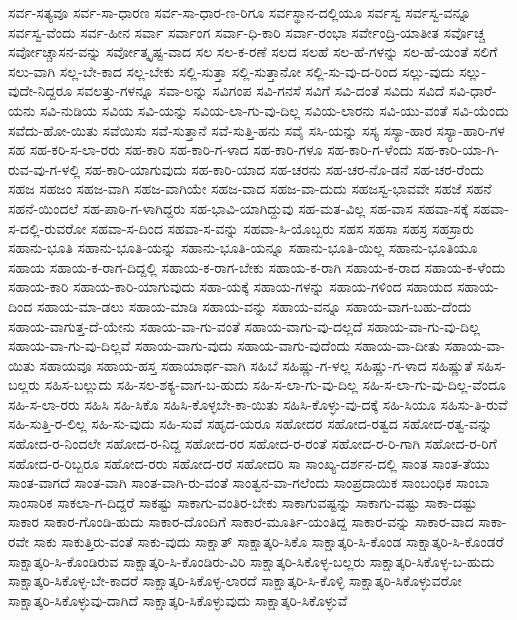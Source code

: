 ಸರ್ವ-ಸತ್ಯವೂ
ಸರ್ವ-ಸಾ-ಧಾರಣ
ಸರ್ವ-ಸಾ-ಧಾರ-ಣ-ರಿಗೂ
ಸರ್ವಸ್ಥಾನ-ದಲ್ಲಿಯೂ
ಸರ್ವಸ್ವ
ಸರ್ವಸ್ವ-ವನ್ನೂ
ಸರ್ವಸ್ವ-ವೆಂದು
ಸರ್ವ-ಹೀನ
ಸರ್ವಾ
ಸರ್ವಾಂಗ
ಸರ್ವಾ-ಧಿ-ಕಾರಿ
ಸರ್ವಾ-ರಂಭಾ
ಸರ್ವೇಂದ್ರಿ-ಯಾತೀತ
ಸರ್ವೊಚ್ಚ
ಸರ್ವೋಚ್ಚಾಸನ-ವನ್ನು
ಸರ್ವೋತ್ಕೃಷ್ಟ-ವಾದ
ಸಲ
ಸಲ-ಕ-ರಣೆ
ಸಲದ
ಸಲಹೆ
ಸಲ-ಹೆ-ಗಳನ್ನು
ಸಲ-ಹೆ-ಯಂತೆ
ಸಲಿಗೆ
ಸಲು-ವಾಗಿ
ಸಲ್ಲ-ಬೇ-ಕಾದ
ಸಲ್ಲ-ಬೇಕು
ಸಲ್ಲಿ-ಸುತ್ತಾ
ಸಲ್ಲಿ-ಸುತ್ತಾನೋ
ಸಲ್ಲಿ-ಸು-ವು-ದ-ರಿಂದ
ಸಲ್ಲು-ವುದು
ಸಲ್ಲು-ವುದೇ-ನಿದ್ದರೂ
ಸವಲತ್ತು-ಗಳನ್ನೂ
ಸವಾ-ಲನ್ನು
ಸವಿಗಂಪ
ಸವಿ-ಗನಸೆ
ಸವಿಗೆ
ಸವಿ-ದಂತೆ
ಸವಿದು
ಸವಿದೆ
ಸವಿ-ಧಾರೆ-ಯನು
ಸವಿ-ನುಡಿಯ
ಸವಿಯ
ಸವಿ-ಯನ್ನು
ಸವಿಯ-ಲಾ-ಗು-ವು-ದಿಲ್ಲ
ಸವಿಯ-ಲಾರನು
ಸವಿ-ಯು-ವಂತೆ
ಸವಿ-ಯೆಂದು
ಸವೆದು-ಹೋ-ಯಿತು
ಸವೆಯಿಸು
ಸವೆ-ಸುತ್ತಾನೆ
ಸವೆ-ಸುತ್ತಿ-ಹನು
ಸವೈ
ಸಸಿ-ಯನ್ನು
ಸಸ್ಯ
ಸಸ್ಯಾ-ಹಾರ
ಸಸ್ಯಾ-ಹಾರಿ-ಗಳ
ಸಹ
ಸಹ-ಕರಿ-ಸ-ಲಾ-ರರು
ಸಹ-ಕಾರಿ
ಸಹ-ಕಾರಿ-ಗ-ಳಾದ
ಸಹ-ಕಾರಿ-ಗಳೂ
ಸಹ-ಕಾರಿ-ಗ-ಳೆಂದು
ಸಹ-ಕಾರಿ-ಯಾ-ಗಿ-ರುವ-ವು-ಗ-ಳಲ್ಲಿ
ಸಹ-ಕಾರಿ-ಯಾಗುವುದು
ಸಹ-ಕಾರಿ-ಯಾದ
ಸಹ-ಚರನು
ಸಹ-ಚರ-ನೊ-ಡನೆ
ಸಹ-ಚರ-ರೆಂದು
ಸಹಜ
ಸಹಜಂ
ಸಹಜ-ವಾಗಿ
ಸಹಜ-ವಾಗಿಯೇ
ಸಹಜ-ವಾದ
ಸಹಜ-ವಾ-ದುದು
ಸಹಜಸ್ವ-ಭಾವವೇ
ಸಹಜೆ
ಸಹನೆ
ಸಹನೆ-ಯಿಂದಲೆ
ಸಹ-ಪಾಠಿ-ಗ-ಳಾಗಿದ್ದರು
ಸಹ-ಭಾವಿ-ಯಾಗಿದ್ದುವು
ಸಹ-ಮತ-ವಿಲ್ಲ
ಸಹ-ವಾಸ
ಸಹವಾ-ಸಕ್ಕೆ
ಸಹವಾ-ಸ-ದಲ್ಲಿ-ರುವರೋ
ಸಹವಾ-ಸ-ದಿಂದ
ಸಹವಾ-ಸ-ವನ್ನು
ಸಹವಾ-ಸಿ-ಯೊಬ್ಬರು
ಸಹಸ
ಸಹಸಾ
ಸಹಸ್ರ
ಸಹಸ್ರಾರು
ಸಹಾನು-ಭೂತಿ
ಸಹಾನು-ಭೂತಿ-ಯನ್ನು
ಸಹಾನು-ಭೂತಿ-ಯನ್ನೂ
ಸಹಾನು-ಭೂತಿ-ಯಿಲ್ಲ
ಸಹಾನು-ಭೂತಿಯೂ
ಸಹಾಯ
ಸಹಾಯ-ಕ-ರಾಗ-ದಿದ್ದಲ್ಲಿ
ಸಹಾಯ-ಕ-ರಾಗ-ಬೇಕು
ಸಹಾಯ-ಕ-ರಾಗಿ
ಸಹಾಯ-ಕ-ರಾದ
ಸಹಾಯ-ಕ-ಳೆಂದು
ಸಹಾಯ-ಕಾರಿ
ಸಹಾಯ-ಕಾರಿ-ಯಾಗುವುದು
ಸಹಾ-ಯಕ್ಕೆ
ಸಹಾಯ-ಗಳನ್ನು
ಸಹಾಯ-ಗಳಿಂದ
ಸಹಾಯದ
ಸಹಾಯ-ದಿಂದ
ಸಹಾಯ-ಮಾ-ಡಲು
ಸಹಾಯ-ಮಾಡಿ
ಸಹಾಯ-ವನ್ನು
ಸಹಾಯ-ವನ್ನೂ
ಸಹಾಯ-ವಾಗ-ಬಹು-ದೆಂದು
ಸಹಾಯ-ವಾಗುತ್ತ-ದೆ-ಯೇನು
ಸಹಾಯ-ವಾ-ಗು-ವಂತೆ
ಸಹಾಯ-ವಾಗು-ವು-ದಲ್ಲದೆ
ಸಹಾಯ-ವಾ-ಗು-ವು-ದಿಲ್ಲ
ಸಹಾಯ-ವಾ-ಗು-ವು-ದಿಲ್ಲವೆ
ಸಹಾಯ-ವಾಗು-ವುದು
ಸಹಾಯ-ವಾಗು-ವುದೆಂದು
ಸಹಾಯ-ವಾ-ದೀತು
ಸಹಾಯ-ವಾ-ಯಿತು
ಸಹಾಯವೂ
ಸಹಾಯ-ಹಸ್ತ
ಸಹಾಯಾರ್ಥ-ವಾಗಿ
ಸಹಿಬೆ
ಸಹಿಷ್ಣು-ಗ-ಳಲ್ಲ
ಸಹಿಷ್ಣು-ಗ-ಳಾದ
ಸಹಿಷ್ಣುತೆ
ಸಹಿಸ-ಬಲ್ಲರು
ಸಹಿಸ-ಬಲ್ಲುದು
ಸಹಿ-ಸಲ-ಶಕ್ಯ-ವಾಗ-ಬ-ಹುದು
ಸಹಿ-ಸ-ಲಾ-ಗು-ವು-ದಿಲ್ಲ
ಸಹಿ-ಸ-ಲಾ-ಗು-ವು-ದಿಲ್ಲ-ವೆಂದೂ
ಸಹಿ-ಸ-ಲಾ-ರರು
ಸಹಿಸಿ
ಸಹಿ-ಸಿಕೊ
ಸಹಿಸಿ-ಕೊಳ್ಳಬೇ-ಕಾ-ಯಿತು
ಸಹಿಸಿ-ಕೊಳ್ಳು-ವು-ದಕ್ಕೆ
ಸಹಿ-ಸಿಯೂ
ಸಹಿಸು-ತಿ-ರುವೆ
ಸಹಿ-ಸುತ್ತಿ-ರ-ಲಿಲ್ಲ
ಸಹಿ-ಸು-ವುದು
ಸಹಿ-ಸುವೆ
ಸಹೃದ-ಯರೂ
ಸಹೋದರ
ಸಹೋದ-ರತ್ವದ
ಸಹೋದ-ರತ್ವ-ವನ್ನು
ಸಹೋದ-ರ-ನಿಂದಲೇ
ಸಹೋದ-ರ-ನಿದ್ದ
ಸಹೋದ-ರರ
ಸಹೋದ-ರ-ರಂತೆ
ಸಹೋದ-ರ-ರಿ-ಗಾಗಿ
ಸಹೋದ-ರ-ರಿಗೆ
ಸಹೋದ-ರ-ರಿಬ್ಬರೂ
ಸಹೋದ-ರರು
ಸಹೋದ-ರರೆ
ಸಹೋದರಿ
ಸಾ
ಸಾಂಖ್ಯ-ದರ್ಶನ-ದಲ್ಲಿ
ಸಾಂತ
ಸಾಂತ-ತೆಯು
ಸಾಂತ-ವಾಗದೆ
ಸಾಂತ-ವಾಗಿ
ಸಾಂತ-ವಾಗಿ-ರು-ವಂತೆ
ಸಾಂತ್ವನ-ವಾ-ಗಲೆಂದು
ಸಾಂಪ್ರದಾಯಿಕ
ಸಾಂಬಂಧಿಕ
ಸಾಂಬಾ
ಸಾಂಸಾರಿಕ
ಸಾಕಲಾ-ಗ-ದಿದ್ದರೆ
ಸಾಕಷ್ಟು
ಸಾಕಾಗು-ವಂತಿರ-ಬೇಕು
ಸಾಕಾಗುವಷ್ಟನ್ನು
ಸಾಕಾಗು-ವಷ್ಟು
ಸಾಕಾ-ದಷ್ಟು
ಸಾಕಾರ
ಸಾಕಾರ-ಗೊಂಡಿ-ಹುದು
ಸಾಕಾರ-ದೊಂದಿಗೆ
ಸಾಕಾರ-ಮೂರ್ತಿ-ಯಂತಿದ್ದ
ಸಾಕಾರ-ವನ್ನು
ಸಾಕಾರ-ವಾದ
ಸಾಕಾ-ರವೇ
ಸಾಕು
ಸಾಕುತ್ತಿರು-ವಂತೆ
ಸಾಕು-ವುದು
ಸಾಕ್ಷಾತ್
ಸಾಕ್ಷಾತ್ಕರಿ-ಸಿಕೊ
ಸಾಕ್ಷಾತ್ಕರಿ-ಸಿ-ಕೊಂಡ
ಸಾಕ್ಷಾತ್ಕರಿ-ಸಿ-ಕೊಂಡರೆ
ಸಾಕ್ಷಾತ್ಕರಿ-ಸಿ-ಕೊಂಡಿರುವ
ಸಾಕ್ಷಾತ್ಕರಿ-ಸಿ-ಕೊಂಡಿರು-ವಿರಿ
ಸಾಕ್ಷಾತ್ಕರಿ-ಸಿಕೊಳ್ಳ-ಬಲ್ಲರು
ಸಾಕ್ಷಾತ್ಕರಿ-ಸಿಕೊಳ್ಳ-ಬ-ಹುದು
ಸಾಕ್ಷಾತ್ಕರಿ-ಸಿಕೊಳ್ಳ-ಬೇ-ಕಾದರೆ
ಸಾಕ್ಷಾತ್ಕರಿ-ಸಿಕೊಳ್ಳ-ಲಾರದೆ
ಸಾಕ್ಷಾತ್ಕರಿ-ಸಿ-ಕೊಳ್ಳಿ
ಸಾಕ್ಷಾತ್ಕರಿ-ಸಿಕೊಳ್ಳುವರೋ
ಸಾಕ್ಷಾತ್ಕರಿ-ಸಿಕೊಳ್ಳುವು-ದಾಗಿದೆ
ಸಾಕ್ಷಾತ್ಕರಿ-ಸಿಕೊಳ್ಳುವುದು
ಸಾಕ್ಷಾತ್ಕರಿ-ಸಿಕೊಳ್ಳುವೆ
